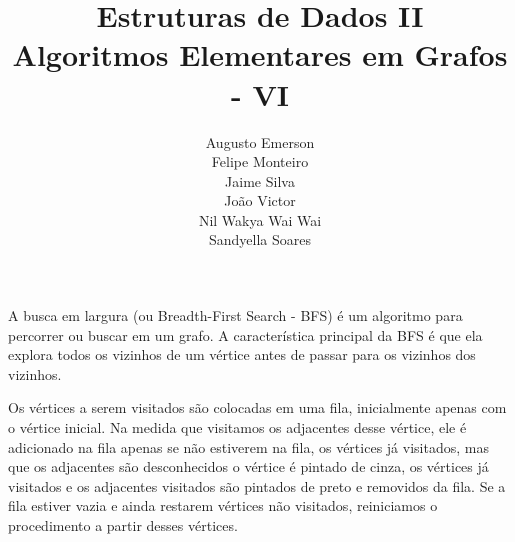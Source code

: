 \documentclass{article}
\title{
    \textbf{Estruturas de Dados II}\\
    Algoritmos Elementares em Grafos - VI
}
\author{
    Augusto Emerson\\
    Felipe Monteiro\\
    Jaime Silva\\
    João Victor\\
    Nil Wakya Wai Wai\\
    Sandyella Soares 
}
\date{} %
\begin{document}
\begin{titlepage}
    \maketitle
    \thispagestyle{empty}  
\end{titlepage}

\section{} %
    A busca em largura (ou Breadth-First Search - BFS) é um algoritmo para percorrer ou buscar em um grafo. A característica principal da BFS é que ela explora todos os vizinhos de um vértice antes de passar para os vizinhos dos vizinhos.
     
    Os vértices a serem visitados são colocadas em uma fila, inicialmente apenas com o vértice inicial. Na medida que visitamos os adjacentes desse vértice, ele é adicionado na fila apenas se não estiverem na fila, os vértices já visitados, mas que os adjacentes são desconhecidos o vértice é pintado de cinza, os vértices já visitados e os adjacentes visitados são pintados de preto e removidos da fila. Se a fila estiver vazia e ainda restarem vértices não visitados, reiniciamos o procedimento a partir desses vértices.\\
    
    \\
    \\
    \\
    \indent{}\\
    \indent{}\\
    \indent\indent{}\\
    \indent\indent\indent{}\\
    \indent\indent\indent{}\\
\end{document}
